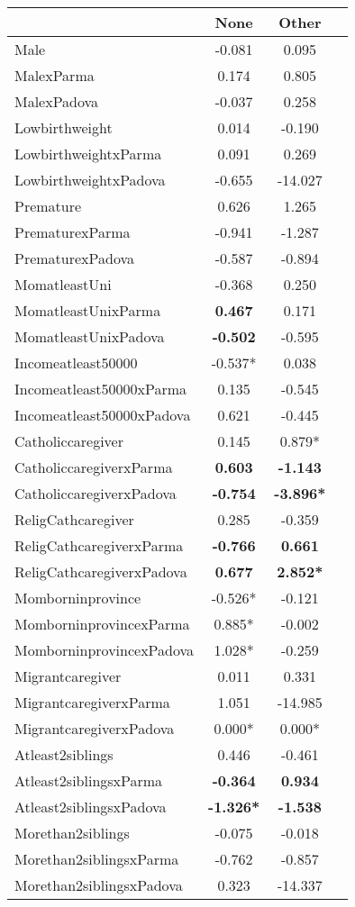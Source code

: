 \begin{tabular}{l c c c}
\toprule
& None & Other \\
\midrule
Male &    -0.081 &     0.095 \\
MalexParma &     0.174 &     0.805 \\
MalexPadova &    -0.037 &     0.258 \\
Lowbirthweight &     0.014 &    -0.190 \\
LowbirthweightxParma &     0.091 &     0.269 \\
LowbirthweightxPadova &    -0.655 &   -14.027 \\
Premature &     0.626 &     1.265 \\
PrematurexParma &    -0.941 &    -1.287 \\
PrematurexPadova &    -0.587 &    -0.894 \\
MomatleastUni &    -0.368 &     0.250 \\
MomatleastUnixParma & \textbf{    0.467} &     0.171 \\
MomatleastUnixPadova & \textbf{   -0.502} &    -0.595 \\
Incomeatleast50000 & -0.537* &     0.038 \\
Incomeatleast50000xParma &     0.135 &    -0.545 \\
Incomeatleast50000xPadova &     0.621 &    -0.445 \\
Catholiccaregiver &     0.145 & 0.879* \\
CatholiccaregiverxParma & \textbf{    0.603} & \textbf{   -1.143} \\
CatholiccaregiverxPadova & \textbf{   -0.754} & \textbf{-3.896*} \\
ReligCathcaregiver &     0.285 &    -0.359 \\
ReligCathcaregiverxParma & \textbf{   -0.766} & \textbf{    0.661} \\
ReligCathcaregiverxPadova & \textbf{    0.677} & \textbf{2.852*} \\
Momborninprovince & -0.526* &    -0.121 \\
MomborninprovincexParma & 0.885* &    -0.002 \\
MomborninprovincexPadova & 1.028* &    -0.259 \\
Migrantcaregiver &     0.011 &     0.331 \\
MigrantcaregiverxParma &     1.051 &   -14.985 \\
MigrantcaregiverxPadova & 0.000* & 0.000* \\
Atleast2siblings &     0.446 &    -0.461 \\
Atleast2siblingsxParma & \textbf{   -0.364} & \textbf{    0.934} \\
Atleast2siblingsxPadova & \textbf{-1.326*} & \textbf{   -1.538} \\
Morethan2siblings &    -0.075 &    -0.018 \\
Morethan2siblingsxParma &    -0.762 &    -0.857 \\
Morethan2siblingsxPadova &     0.323 &   -14.337 \\
\bottomrule
\end{tabular}
